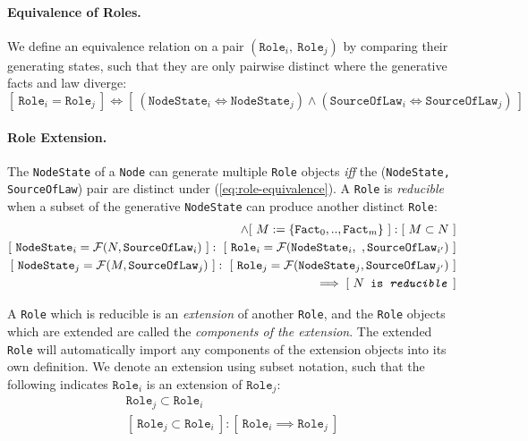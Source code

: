 \documentclass{article}
\numberwithin{equation}{section}
\begin{document}
\paragraph{Equivalence of Roles.} We define an equivalence relation on a pair $(\texttt{Role}_i, \ \texttt{Role}_j)$ by comparing their generating states, such that they are only pairwise distinct where the generative facts and law diverge:  
\begin{equation}\label{eq:role-equivalence}
[ \ \texttt{Role}_i = \texttt{Role}_j \ ] \iff [ \ (\texttt{NodeState}_i \iff \texttt{NodeState}_j) \land (\texttt{SourceOfLaw}_i \iff \texttt{SourceOfLaw}_j) \ ]
\end{equation}

\paragraph{Role Extension.} The \texttt{NodeState} of a \texttt{Node} can generate multiple \texttt{Role} objects \textit{iff} the (\texttt{NodeState, SourceOfLaw}) pair are distinct under (\ref{eq:role-equivalence}). A \texttt{Role} is \textit{reducible} when a subset of the generative \texttt{NodeState} can produce another distinct \texttt{Role}:
\begin{align}
	[ \ N := \{ \texttt{Fact}_0, .., \texttt{Fact}_n \} \ ] \land [ \ M := \{ \texttt{Fact}_0, .., \texttt{Fact}_m \} \ ] : [ \ M \subset N \ ] \\
	[ \ \texttt{NodeState}_i = \mathcal{F}(N, \texttt{SourceOfLaw}_i) \ ] : \ [ \ \texttt{Role}_i = \mathcal{F}(\texttt{NodeState}_i, \ , \texttt{SourceOfLaw}_{i'}) \ ] \\
	[ \ \texttt{NodeState}_j = \mathcal{F}(M, \texttt{SourceOfLaw}_j) \ ] : \ [ \ \texttt{Role}_j = \mathcal{F}(\texttt{NodeState}_j, \texttt{SourceOfLaw}_{j'}) \ ] \\
	\qquad \implies [ \ \texttt{$N$ is \textit{reducible}} \ ]
\end{align}

A \texttt{Role} which is reducible is an \textit{extension} of another \texttt{Role}, and the \texttt{Role} objects which are extended are called the \textit{components of the extension}. The extended \texttt{Role} will automatically import any components of the extension objects into its own definition. We denote an extension using subset notation, such that the following indicates $\texttt{Role}_i$ is an extension of $\texttt{Role}_j$: 
\begin{align}
	\texttt{Role}_j \subset \texttt{Role}_i \\
	[ \ \texttt{Role}_j \subset \texttt{Role}_i \ ] : [ \ \texttt{Role}_i \implies \texttt{Role}_j \ ]
\end{align}
\end{document}
